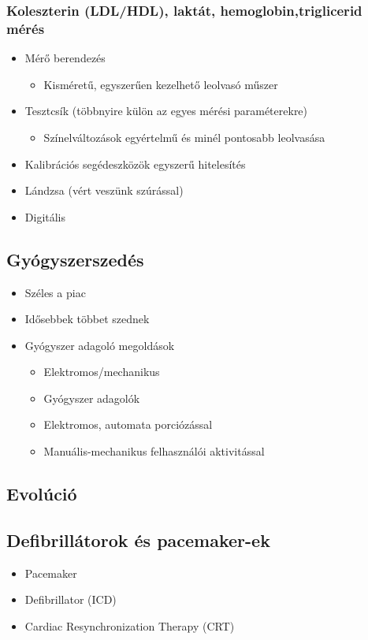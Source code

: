 \subsubsection{Koleszterin (LDL/HDL), laktát, hemoglobin,triglicerid mérés}
\begin{itemize}
    \item Mérő berendezés
    \begin{itemize}
        \item Kisméretű, egyszerűen kezelhető leolvasó műszer
    \end{itemize}
    \item Tesztcsík (többnyire külön az egyes mérési paraméterekre)
    \begin{itemize}
        \item Színelváltozások egyértelmű és minél pontosabb leolvasása
    \end{itemize}
    \item Kalibrációs segédeszközök egyszerű hitelesítés
    \item Lándzsa (vért veszünk szúrással)
    \item Digitális
\end{itemize}

\subsection{Gyógyszerszedés}
\begin{itemize}
    \item Széles a piac
    \item Idősebbek többet szednek
    \item Gyógyszer adagoló megoldások
    \begin{itemize}
        \item Elektromos/mechanikus
        \item Gyógyszer adagolók
        \item Elektromos, automata porciózással
        \item Manuális-mechanikus felhasználói aktivitással
    \end{itemize}
\end{itemize}

\subsection{Evolúció}

\subsection{Defibrillátorok és pacemaker-ek}
\begin{itemize}
    \item Pacemaker
    \item Defibrillator (ICD)
    \item Cardiac Resynchronization Therapy (CRT)
\end{itemize}

